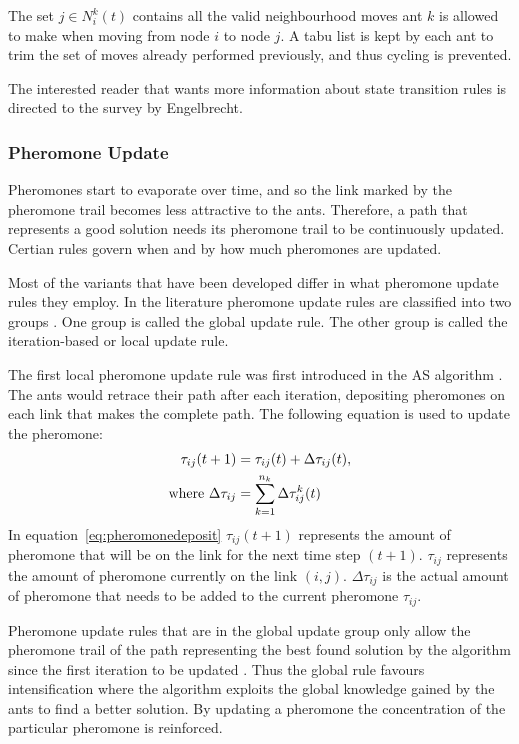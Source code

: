 The set $j \in N^k_i(t)$ contains all the valid neighbourhood moves ant $k$ is allowed to make when moving from node $i$ to node $j$. A tabu list is kept by each ant to trim the set of moves already performed previously, and thus cycling is prevented.

The interested reader that wants more information about state transition rules is directed to the survey by Engelbrecht\cite{FundamentalSwarm}.
\subsubsection{Pheromone Update}
Pheromones start to evaporate over time, and so the link marked by the pheromone trail becomes less attractive to the ants. Therefore, a path that represents a good solution needs its pheromone trail to be continuously updated. Certian rules govern when and by how much pheromones are updated.

 Most of the variants that have been developed differ in what pheromone update rules they employ. In the literature pheromone update rules are classified into two groups \cite{CompuIntelligenceIntro}. One group is called the global update rule. The other group is called the iteration-based or local update rule\cite{CompuIntelligenceIntro}. 

The first local pheromone update rule was first introduced in the \gls{AS} algorithm \cite{CompuIntelligenceIntro,AntSurvey,AntsAndStigmergy}. The ants would retrace their path after each iteration, depositing pheromones on each link that makes the complete path. The following equation is used to update the pheromone:
\begin{align}
\label{eq:pheromonedeposit}
 \tau_{ij}(t+1) &= \tau_{ij}(t) + \Delta\tau_{ij}(t),\\ 
 \text{where }\Delta\tau_{ij} &= \sum^{n_k}_{k=1}\Delta\tau^k_{ij}(t) \notag
\end{align}
In equation~\ref{eq:pheromonedeposit} $\tau_{ij}(t+1)$ represents the amount of pheromone that will be on the link for the next time step $(t+1)$. $\tau_{ij}$ represents the amount of pheromone currently on the link $(i,j)$. $\Delta\tau_{ij}$ is the actual amount of pheromone that needs to be added to the current pheromone $\tau_{ij}$.

Pheromone update rules that are in the global update group only allow the pheromone trail of the path representing the best found solution by the algorithm since the first iteration to be updated \cite{CompuIntelligenceIntro}. Thus the global rule favours intensification where the algorithm exploits the global knowledge gained by the ants to find a better solution. By updating a pheromone the concentration of the particular pheromone is reinforced.


